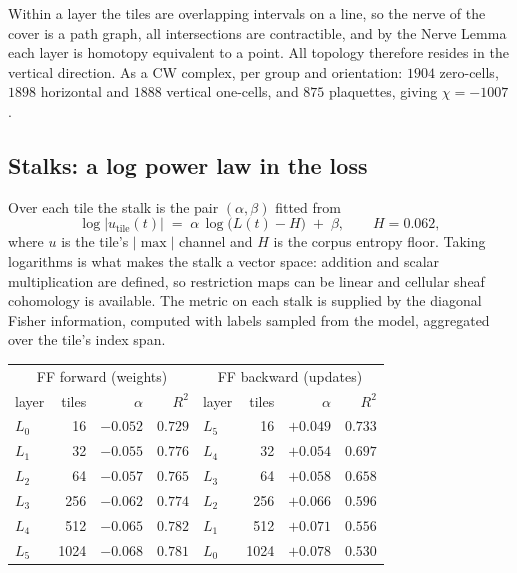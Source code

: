 Within a layer the tiles are overlapping intervals on a line, so the nerve of
the cover is a path graph, all intersections are contractible, and by the Nerve
Lemma each layer is homotopy equivalent to a point. All topology therefore
resides in the vertical direction. As a CW complex, per group and orientation:
$1904$ zero-cells, $1898$ horizontal and $1888$ vertical one-cells, and $875$
plaquettes, giving $\chi = -1007$.

\subsection{Stalks: a log power law in the loss}

Over each tile the stalk is the pair $(\alpha,\beta)$ fitted from
\begin{equation}
  \log\bigl|u_{\text{tile}}(t)\bigr|
  \;=\; \alpha\,\log\bigl(L(t)-H\bigr) \;+\; \beta,
  \qquad H = 0.062,
  \label{eq:powerlaw}
\end{equation}
where $u$ is the tile's $|\max|$ channel and $H$ is the corpus entropy floor.
Taking logarithms is what makes the stalk a vector space: addition and scalar
multiplication are defined, so restriction maps can be linear and cellular
sheaf cohomology is available. The metric on each stalk is supplied by the
diagonal Fisher information, computed with labels sampled from the model,
aggregated over the tile's index span.

\begin{center}
\begin{tabular}{lrrr|lrrr}
\toprule
\multicolumn{4}{c|}{FF forward (weights)} & \multicolumn{4}{c}{FF backward (updates)} \\
layer & tiles & $\alpha$ & $R^2$ & layer & tiles & $\alpha$ & $R^2$ \\
\midrule
$L_0$ & 16   & $-0.052$ & $0.729$ & $L_5$ & 16   & $+0.049$ & $0.733$ \\
$L_1$ & 32   & $-0.055$ & $0.776$ & $L_4$ & 32   & $+0.054$ & $0.697$ \\
$L_2$ & 64   & $-0.057$ & $0.765$ & $L_3$ & 64   & $+0.058$ & $0.658$ \\
$L_3$ & 256  & $-0.062$ & $0.774$ & $L_2$ & 256  & $+0.066$ & $0.596$ \\
$L_4$ & 512  & $-0.065$ & $0.782$ & $L_1$ & 512  & $+0.071$ & $0.556$ \\
$L_5$ & 1024 & $-0.068$ & $0.781$ & $L_0$ & 1024 & $+0.078$ & $0.530$ \\
\bottomrule
\end{tabular}
\end{center}

